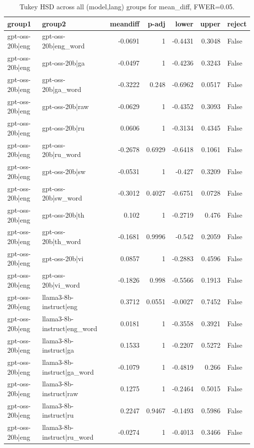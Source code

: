 \begin{table}
\caption{Tukey HSD across all (model,lang) groups for mean_diff, FWER=0.05.}
\label{tab:tukey_all_models_all_langs_mean_diff}
\begin{tabular}{l l r r r r l}
\toprule
group1 & group2 & meandiff & p-adj & lower & upper & reject \\
\midrule
gpt-oss-20b|eng & gpt-oss-20b|eng_word & -0.0691 & 1 & -0.4431 & 0.3048 & False \\
gpt-oss-20b|eng & gpt-oss-20b|ga & -0.0497 & 1 & -0.4236 & 0.3243 & False \\
gpt-oss-20b|eng & gpt-oss-20b|ga_word & -0.3222 & 0.248 & -0.6962 & 0.0517 & False \\
gpt-oss-20b|eng & gpt-oss-20b|raw & -0.0629 & 1 & -0.4352 & 0.3093 & False \\
gpt-oss-20b|eng & gpt-oss-20b|ru & 0.0606 & 1 & -0.3134 & 0.4345 & False \\
gpt-oss-20b|eng & gpt-oss-20b|ru_word & -0.2678 & 0.6929 & -0.6418 & 0.1061 & False \\
gpt-oss-20b|eng & gpt-oss-20b|sw & -0.0531 & 1 & -0.427 & 0.3209 & False \\
gpt-oss-20b|eng & gpt-oss-20b|sw_word & -0.3012 & 0.4027 & -0.6751 & 0.0728 & False \\
gpt-oss-20b|eng & gpt-oss-20b|th & 0.102 & 1 & -0.2719 & 0.476 & False \\
gpt-oss-20b|eng & gpt-oss-20b|th_word & -0.1681 & 0.9996 & -0.542 & 0.2059 & False \\
gpt-oss-20b|eng & gpt-oss-20b|vi & 0.0857 & 1 & -0.2883 & 0.4596 & False \\
gpt-oss-20b|eng & gpt-oss-20b|vi_word & -0.1826 & 0.998 & -0.5566 & 0.1913 & False \\
gpt-oss-20b|eng & llama3-8b-instruct|eng & 0.3712 & 0.0551 & -0.0027 & 0.7452 & False \\
gpt-oss-20b|eng & llama3-8b-instruct|eng_word & 0.0181 & 1 & -0.3558 & 0.3921 & False \\
gpt-oss-20b|eng & llama3-8b-instruct|ga & 0.1533 & 1 & -0.2207 & 0.5272 & False \\
gpt-oss-20b|eng & llama3-8b-instruct|ga_word & -0.1079 & 1 & -0.4819 & 0.266 & False \\
gpt-oss-20b|eng & llama3-8b-instruct|raw & 0.1275 & 1 & -0.2464 & 0.5015 & False \\
gpt-oss-20b|eng & llama3-8b-instruct|ru & 0.2247 & 0.9467 & -0.1493 & 0.5986 & False \\
gpt-oss-20b|eng & llama3-8b-instruct|ru_word & -0.0274 & 1 & -0.4013 & 0.3466 & False \\

\end{tabular}
\end{table}
